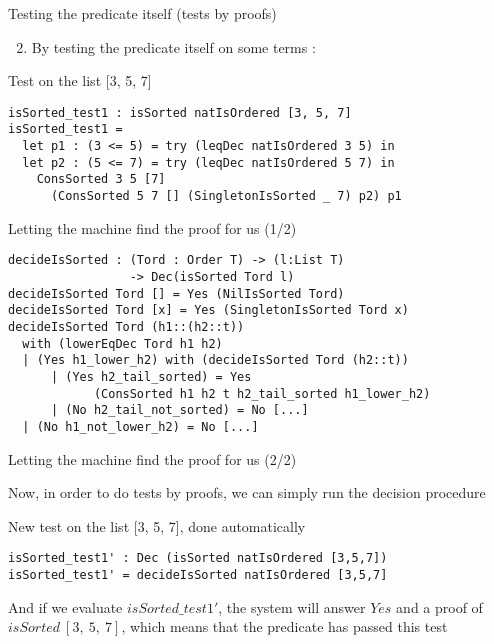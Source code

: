 \documentclass[french]{beamer}
\begin{document}
\begin{frame}[fragile]{Testing the predicate itself (tests by proofs)}

\begin{enumerate}
\setcounter{enumi}{1}
\item By testing the predicate itself on some terms :
\end{enumerate}		
		
	\begin{block}{Test on the list [3, 5, 7]}		
		
		\begin{lstlisting}
isSorted_test1 : isSorted natIsOrdered [3, 5, 7]
isSorted_test1 = 
  let p1 : (3 <= 5) = try (leqDec natIsOrdered 3 5) in
  let p2 : (5 <= 7) = try (leqDec natIsOrdered 5 7) in
    ConsSorted 3 5 [7] 
      (ConsSorted 5 7 [] (SingletonIsSorted _ 7) p2) p1
		\end{lstlisting}
		
	\end{block}

\end{frame}



\begin{frame}[fragile]{Letting the machine find the proof for us (1/2)}

\begin{lstlisting}
decideIsSorted : (Tord : Order T) -> (l:List T) 
                 -> Dec(isSorted Tord l)
decideIsSorted Tord [] = Yes (NilIsSorted Tord)
decideIsSorted Tord [x] = Yes (SingletonIsSorted Tord x)
decideIsSorted Tord (h1::(h2::t)) 
  with (lowerEqDec Tord h1 h2)
  | (Yes h1_lower_h2) with (decideIsSorted Tord (h2::t))
      | (Yes h2_tail_sorted) = Yes 
      		(ConsSorted h1 h2 t h2_tail_sorted h1_lower_h2) 
      | (No h2_tail_not_sorted) = No [...]
  | (No h1_not_lower_h2) = No [...]
\end{lstlisting}

\end{frame}



\begin{frame}[fragile]{Letting the machine find the proof for us (2/2)}

Now, in order to do tests by proofs, we can simply run the decision procedure

	\begin{block}{New test on the list [3, 5, 7], done automatically}

\begin{lstlisting}
isSorted_test1' : Dec (isSorted natIsOrdered [3,5,7])
isSorted_test1' = decideIsSorted natIsOrdered [3,5,7] 
\end{lstlisting}

	\end{block}

And if we evaluate $isSorted\_test1'$, the system will answer $Yes$ and a proof of $isSorted\ [3,\ 5,\ 7]$, which means that the predicate has passed this test

\end{frame}
\end{document}
